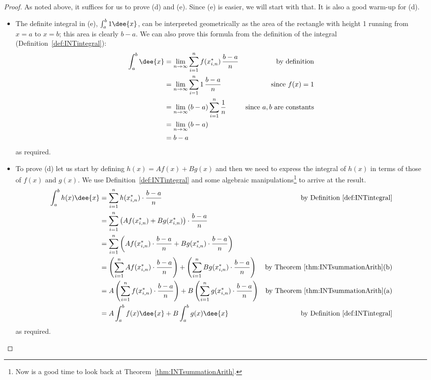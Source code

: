 \begin{proof}
As noted above, it suffices for us to prove (d) and (e). Since (e) is easier,
we
will
start with that. It is also a good warm-up for (d).
\begin{itemize}
 \item The definite integral in (e), $\int_a^b 1 \dee{x}$, can be interpreted
geometrically as the area of the rectangle with height 1 running from $x=a$ to
$x=b$; this
area is clearly $b-a$. We can also prove this formula from the definition of
the
integral
(Definition~\ref{def:INTintegral}):
\begin{align*}
\int_a^b\dee{x}
&=\lim_{n\rightarrow\infty}\sum_{i=1}^n f(x_{i,n}^*)\,\frac{b-a}{n}
&\text{by definition}\\
&=\lim_{n\rightarrow\infty}\sum_{i=1}^n 1\,\frac{b-a}{n}
&\text{since $f(x)=1$}\\
&=\lim_{n\rightarrow\infty}(b-a) \sum_{i=1}^n \frac{1}{n}
&\text{since $a,b$ are constants}\\
&=\lim_{n\rightarrow\infty}(b-a)\\
&=b-a
\end{align*}
as required.
\item To prove (d) let us start by defining $h(x) = Af(x)+Bg(x)$ and then we
need to
express the integral of $h(x)$ in terms of those of $f(x)$ and $g(x)$. We use
Definition~\ref{def:INTintegral} and some algebraic manipulations\footnote{Now
is a good
time to look back at Theorem~\ref{thm:INTsummationArith}.} to arrive at the
result.
\begin{align*}
\int_a^bh(x) \dee{x}
&= \sum_{i=1}^n h(x_{i,n}^*)\cdot\frac{b-a}{n}
&\text{by Definition~\ref{def:INTintegral}}\\
&= \sum_{i=1}^n \left(Af(x_{i,n}^*)+Bg(x_{i,n}^*) \right)\cdot \frac{b-a}{n}\\
&= \sum_{i=1}^n \left(Af(x_{i,n}^*)\cdot \frac{b-a}{n} + Bg(x_{i,n}^*)\cdot
\frac{b-a}{n}
\right)\\
&= \left(\sum_{i=1}^n Af(x_{i,n}^*)\cdot \frac{b-a}{n}\right)
 + \left(\sum_{i=1}^n Bg(x_{i,n}^*)\cdot \frac{b-a}{n}\right)
&\text{by Theorem~\ref{thm:INTsummationArith}(b)}\\
&= A\left(\sum_{i=1}^n f(x_{i,n}^*)\cdot \frac{b-a}{n}\right)
 + B\left(\sum_{i=1}^n g(x_{i,n}^*)\cdot \frac{b-a}{n}\right)
&\text{by Theorem~\ref{thm:INTsummationArith}(a)}\\
&= A \int_a^b f(x) \dee{x} + B \int_a^b g(x) \dee{x}
&\text{by Definition~\ref{def:INTintegral}}
\end{align*}
as required.
\end{itemize}
\end{proof}
